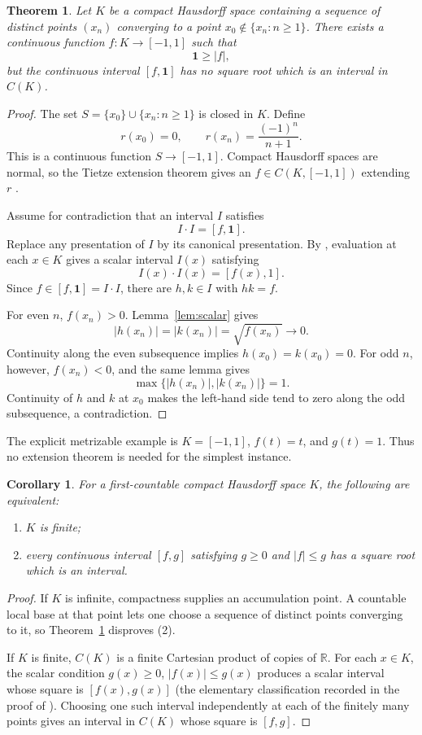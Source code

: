 \documentclass[11pt]{article}
\newtheorem{theorem}{Theorem}
\newtheorem{corollary}{Corollary}
\newcommand{\one}{\mathbf 1}
\begin{document}
\begin{theorem}\label{thm:main}
Let $K$ be a compact Hausdorff space containing a sequence of distinct points
$(x_n)$ converging to a point $x_0\notin\{x_n:n\geq1\}$.  There exists a
continuous function $f:K\to[-1,1]$ such that
\[
 \one\geq |f|,
\]
but the continuous interval $[f,\one]$ has no square root which is an
interval in $C(K)$.
\end{theorem}

\begin{proof}
The set $S=\{x_0\}\cup\{x_n:n\geq1\}$ is closed in $K$.  Define
\[
 r(x_0)=0,\qquad r(x_n)=\frac{(-1)^n}{n+1}.
\]
This is a continuous function $S\to[-1,1]$.  Compact Hausdorff spaces are
normal, so the Tietze extension theorem gives an
$f\in C(K,[-1,1])$ extending $r$ \cite[Section~33]{munkres}.

Assume for contradiction that an interval $I$ satisfies
\[
 I\cdot I=[f,\one].
\]
Replace any presentation of $I$ by its canonical presentation.  By
\cite[Lemma~3.1(i)]{source}, evaluation at each $x\in K$ gives a scalar
interval $I(x)$ satisfying
\[
 I(x)\cdot I(x)=[f(x),1].
\]
Since $f\in[f,\one]=I\cdot I$, there are $h,k\in I$ with $hk=f$.

For even $n$, $f(x_n)>0$.  Lemma~\ref{lem:scalar} gives
\[
 |h(x_n)|=|k(x_n)|=\sqrt{f(x_n)}\longrightarrow0.
\]
Continuity along the even subsequence implies
$h(x_0)=k(x_0)=0$.  For odd $n$, however, $f(x_n)<0$, and the same lemma
gives
\[
 \max\{|h(x_n)|,|k(x_n)|\}=1.
\]
Continuity of $h$ and $k$ at $x_0$ makes the left-hand side tend to zero
along the odd subsequence, a contradiction.
\end{proof}

The explicit metrizable example is $K=[-1,1]$, $f(t)=t$, and $g(t)=1$.
Thus no extension theorem is needed for the simplest instance.

\begin{corollary}\label{cor:characterization}
For a first-countable compact Hausdorff space $K$, the following are
equivalent:
\begin{enumerate}
\item $K$ is finite;
\item every continuous interval $[f,g]$ satisfying
$g\geq0$ and $|f|\leq g$ has a square root which is an interval.
\end{enumerate}
\end{corollary}

\begin{proof}
If $K$ is infinite, compactness supplies an accumulation point.  A countable
local base at that point lets one choose a sequence of distinct points
converging to it, so Theorem~\ref{thm:main} disproves (2).

If $K$ is finite, $C(K)$ is a finite Cartesian product of copies of
$\mathbb R$.  For each $x\in K$, the scalar condition
$g(x)\geq0$, $|f(x)|\leq g(x)$ produces a scalar interval whose square is
$[f(x),g(x)]$ (the elementary classification recorded in the proof of
\cite[Proposition~5.1]{source}).  Choosing one such interval independently
at each of the finitely many points gives an interval in $C(K)$ whose square
is $[f,g]$.
\end{proof}
\end{document}
